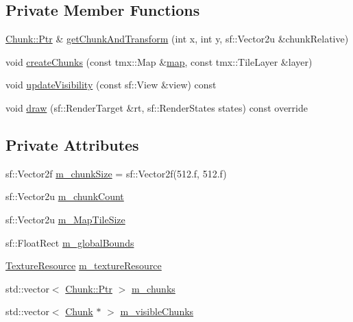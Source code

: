 \subsection*{Private Member Functions}
\begin{DoxyCompactItemize}
\item 
\hyperlink{classMapLayer_1_1Chunk_ab1df4d3621c5d9f83c2edb46d0744078}{Chunk\+::\+Ptr} \& \hyperlink{classMapLayer_a5686d500c087caa0c096c965d5d36574}{get\+Chunk\+And\+Transform} (int x, int y, sf\+::\+Vector2u \&chunk\+Relative)
\item 
void \hyperlink{classMapLayer_a853b2091fa76fabe4446797e0a01809a}{create\+Chunks} (const tmx\+::\+Map \&\hyperlink{classmap}{map}, const tmx\+::\+Tile\+Layer \&layer)
\item 
void \hyperlink{classMapLayer_a6602d1d89676fa73ace9934f7b77c0c5}{update\+Visibility} (const sf\+::\+View \&view) const
\item 
void \hyperlink{classMapLayer_a6a43405b98f14c3efbe02395c466c1e6}{draw} (sf\+::\+Render\+Target \&rt, sf\+::\+Render\+States states) const override
\end{DoxyCompactItemize}
\subsection*{Private Attributes}
\begin{DoxyCompactItemize}
\item 
sf\+::\+Vector2f \hyperlink{classMapLayer_af8d36b6ff112417b9d4f73a52e8859ae}{m\+\_\+chunk\+Size} = sf\+::\+Vector2f(512.f, 512.f)
\item 
sf\+::\+Vector2u \hyperlink{classMapLayer_ae816f79d9d81eb7e9e207c00bbf41218}{m\+\_\+chunk\+Count}
\item 
sf\+::\+Vector2u \hyperlink{classMapLayer_a9863689eb080d27e7a99dea7c20aee41}{m\+\_\+\+Map\+Tile\+Size}
\item 
sf\+::\+Float\+Rect \hyperlink{classMapLayer_a1e1ca5c4bedf393c1c85e2ced3bbf50a}{m\+\_\+global\+Bounds}
\item 
\hyperlink{classMapLayer_a64011087426e436e3cb8374570378d68}{Texture\+Resource} \hyperlink{classMapLayer_ad7cade67df5e55b3c6a960476e6d2cb9}{m\+\_\+texture\+Resource}
\item 
std\+::vector$<$ \hyperlink{classMapLayer_1_1Chunk_ab1df4d3621c5d9f83c2edb46d0744078}{Chunk\+::\+Ptr} $>$ \hyperlink{classMapLayer_a07e8acdbdfc63584a2b9276ca499ad70}{m\+\_\+chunks}
\item 
std\+::vector$<$ \hyperlink{classMapLayer_1_1Chunk}{Chunk} $\ast$ $>$ \hyperlink{classMapLayer_a74941b5479affea58ea8a3068770d430}{m\+\_\+visible\+Chunks}
\end{DoxyCompactItemize}


